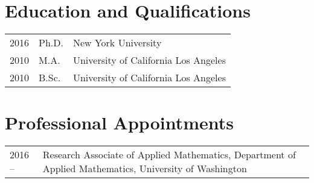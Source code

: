  
\section{Education and Qualifications}
\begin{tabular}{p{2cm}ll}
2016 & Ph.D. & New York University \\
2010 & M.A. & University of California Los Angeles\\
2010 & B.Sc. & University of California Los Angeles
\end{tabular}

\section{Professional Appointments}
\begin{tabular}{p{2cm}p{15cm}}
2016 -- & Research Associate of Applied Mathematics,
Department of Applied Mathematics, University of Washington
\end{tabular}

